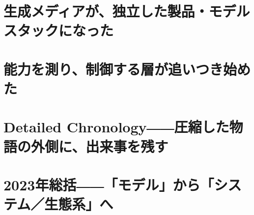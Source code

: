 \documentclass[lualatex,a4paper,11pt]{jlreq}
\begin{document}
\Needspace{0.45\textheight}
\bigskip
\section{生成メディアが、独立した製品・モデルスタックになった}
\label{pkg:generative-media}

\medskip
\begin{multicols}{2}

\end{multicols}


\Needspace{0.45\textheight}
\bigskip
\section{能力を測り、制御する層が追いつき始めた}
\label{pkg:evaluation-control}

\medskip
\begin{multicols}{2}

\end{multicols}


\Needspace{0.45\textheight}
\bigskip
\section{Detailed Chronology――圧縮した物語の外側に、出来事を残す}
\label{pkg:annual-chronology}

\medskip
\begin{multicols}{2}

\end{multicols}

\Needspace{0.45\textheight}
\bigskip
\section{2023年総括――「モデル」から「システム／生態系」へ}
\label{pkg:annual-synthesis}

\medskip
\begin{multicols}{2}

\end{multicols}

\Needspace{0.30\textheight}
\bigskip
{}\par
\smallskip
\printbibliography[title={References / Source Notes}]
\end{document}

